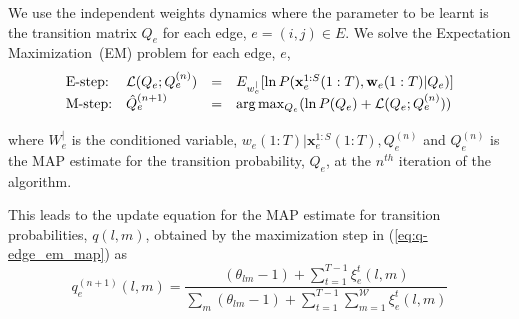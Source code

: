 \documentclass[11pt]{article}
\begin{document}
We use the independent weights dynamics where the parameter to be learnt is
the transition matrix $Q_{e}$ for each edge, $e = (i, j) \in E$.  We solve the Expectation
Maximization~(EM)\cite{Dempster77em} problem for each edge,
$e$,
\begin{equation}
  \label{eq:q-edge_em_map}
  \begin{array}[h]{llll}
  \textrm{E-step:} & {\mathcal L}(Q_{e}; Q_{e}^{(n)}) &=&
  E_{w_{e}^{|} }  [ \ln P(\mathbf{x}_{e}^{1:S}(1:T),
  \mathbf{w}_{e}({1:T}) | Q_{e})] \\
\vspace{2 mm}
  \textrm{M-step:} & \hat{Q}_{e}^{(n+1)} &=& \arg\max_{Q_{e}} (\ln P(Q_{e}) +
  {\mathcal L}(Q_{e}; Q_{e}^{(n)} ) ) 
  \end{array}
\end{equation}
where $W^{|}_{e}$ is the conditioned variable, $w_{e}(1:T)|
\mathbf{x}_{e}^{1:S}(1:T), Q_{e}^{(n)}$ and $Q_{e}^{(n)}$ is the
MAP estimate for the transition probability, $Q_{e}$, at the $n^{th}$
iteration of the algorithm. 

This leads to the update equation for the MAP estimate for transition
probabilities, $q(l,m)$, obtained by the maximization step in (\ref{eq:q-edge_em_map}) as
\begin{equation}
  \label{eq:q-update}
  q^{(n+1)}_{e}(l, m) = \frac{(\theta_{lm}-1) + \sum_{t=1}^{T-1} \xi^{t}_{e}(l,
    m) }{\sum_{m} (\theta_{lm} -1) + \sum^{T-1}_{t=1} \sum^{\mathcal
      W}_{m=1} \xi^{t}_{e}(l,m)}
\end{equation}



\end{document}
